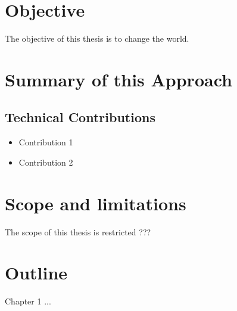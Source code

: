 \section{Objective}
The objective of this thesis is to change the world.


 
 
\section{Summary of this Approach}

\subsection{Technical Contributions}
\begin{itemize}
	\item Contribution 1
	\item Contribution 2
\end{itemize}




\section{Scope and limitations}
\label{sec:scope}
The scope of this thesis is restricted ???

\section{Outline}
Chapter 1 ...

